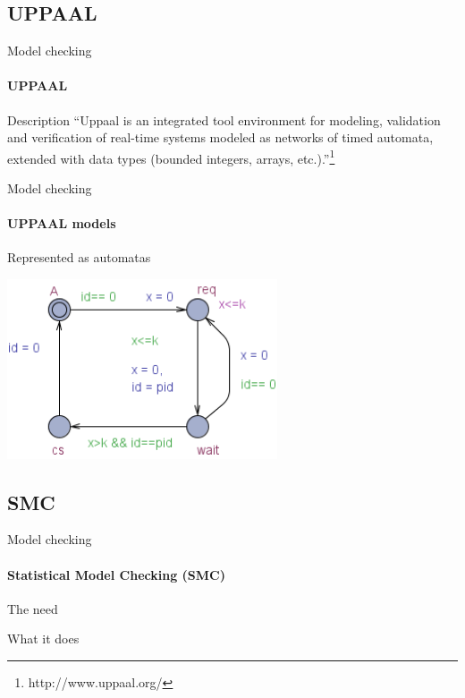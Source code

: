 \subsection{UPPAAL}
\begin{frame}{Model checking}
	\framesubtitle{UPPAAL}
	
	
	
	\begin{block}{Description}
		\footnotesize 
		``Uppaal is an integrated tool environment for modeling, 
		validation and verification of real-time systems modeled as networks of timed automata, 
		extended with data types (bounded integers, arrays, etc.).''\footnote{http://www.uppaal.org/}
	\end{block}
\end{frame}
\begin{frame}{Model checking}
	\framesubtitle{UPPAAL models}
	Represented as automatas
	
	\includegraphics[width=0.6\textwidth]{images/P.png}
\end{frame}

\subsection{SMC}
\begin{frame}{Model checking}
	\framesubtitle{Statistical Model Checking (SMC)}
	The need
	
	What it does
\end{frame}